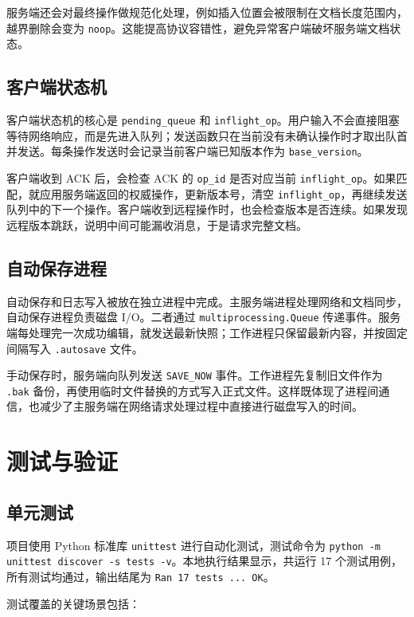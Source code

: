 服务端还会对最终操作做规范化处理，例如插入位置会被限制在文档长度范围内，越界删除会变为 \verb|noop|。这能提高协议容错性，避免异常客户端破坏服务端文档状态。

\subsection{客户端状态机}

客户端状态机的核心是 \verb|pending_queue| 和 \verb|inflight_op|。用户输入不会直接阻塞等待网络响应，而是先进入队列；发送函数只在当前没有未确认操作时才取出队首并发送。每条操作发送时会记录当前客户端已知版本作为 \verb|base_version|。

客户端收到 ACK 后，会检查 ACK 的 \verb|op_id| 是否对应当前 \verb|inflight_op|。如果匹配，就应用服务端返回的权威操作，更新版本号，清空 \verb|inflight_op|，再继续发送队列中的下一个操作。客户端收到远程操作时，也会检查版本是否连续。如果发现远程版本跳跃，说明中间可能漏收消息，于是请求完整文档。

\subsection{自动保存进程}

自动保存和日志写入被放在独立进程中完成。主服务端进程处理网络和文档同步，自动保存进程负责磁盘 I/O。二者通过 \verb|multiprocessing.Queue| 传递事件。服务端每处理完一次成功编辑，就发送最新快照；工作进程只保留最新内容，并按固定间隔写入 \verb|.autosave| 文件。

手动保存时，服务端向队列发送 \verb|SAVE_NOW| 事件。工作进程先复制旧文件作为 \verb|.bak| 备份，再使用临时文件替换的方式写入正式文件。这样既体现了进程间通信，也减少了主服务端在网络请求处理过程中直接进行磁盘写入的时间。

\section{测试与验证}

\subsection{单元测试}

项目使用 Python 标准库 \verb|unittest| 进行自动化测试，测试命令为 \verb|python -m unittest discover -s tests -v|。本地执行结果显示，共运行 17 个测试用例，所有测试均通过，输出结尾为 \verb|Ran 17 tests ... OK|。

测试覆盖的关键场景包括：


